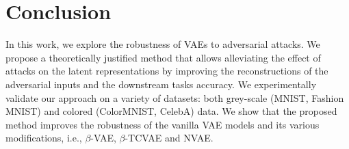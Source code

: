 \section{Conclusion}
In this work, we explore the robustness of VAEs to adversarial attacks.  We propose a theoretically justified method that allows alleviating the effect of attacks on the latent representations by improving the reconstructions of the adversarial inputs and the downstream tasks accuracy. We experimentally validate our approach on a variety of datasets: both grey-scale (MNIST, Fashion MNIST) and colored (ColorMNIST, CelebA) data. We show that the proposed method improves the robustness of the vanilla VAE models and its various modifications, i.e., $\beta$-VAE, $\beta$-TCVAE and NVAE.

